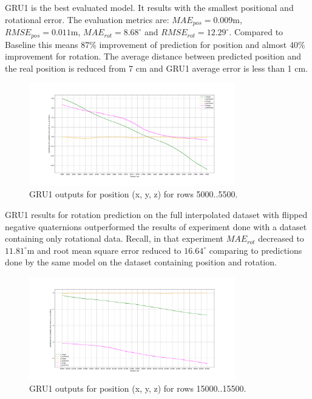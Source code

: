 GRU1 is the best evaluated model. It results with the smallest positional and rotational error. The evaluation metrics are: $MAE_{pos} = 0.009$m, $RMSE_{pos} = 0.011$m, $MAE_{rot} = 8.68^{\circ}$ and $RMSE_{rot}  =12.29^{\circ}$. Compared to Baseline this means 87\% improvement of prediction for position and almost 40\% improvement for rotation. The average distance between predicted position and the real position is reduced from 7 cm and GRU1 average error is less than 1 cm.  
\begin{figure}[b!]
	\begin{center}
		\includegraphics[width=0.8\textwidth, keepaspectratio]{gfx/gru1-xyz_position.pdf}
		\caption{GRU1 outputs for position (x, y, z) for rows 5000..5500.}
		\label{fig:gru1-1}
	\end{center}
\end{figure}

GRU1 results for rotation prediction on the full interpolated dataset with flipped negative quaternions outperformed the results of experiment done with a dataset containing only rotational data. Recall, in that experiment $MAE_{rot}$ decreased to $11.81^{\circ}$m and root mean square error reduced to  $16.64^{\circ}$ comparing to predictions done by the same model on the dataset containing position and rotation.
\begin{figure}[t!]
	\begin{center}
		\includegraphics[width=0.8\textwidth]{gfx/gru1-xyz_position_15000.pdf}
		\caption{GRU1 outputs for position (x, y, z) for rows 15000..15500.}
		\label{fig:gru1-2}
	\end{center}
\end{figure}

